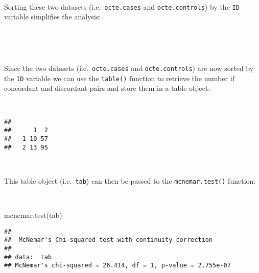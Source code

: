 \documentclass[
  12pt,
  a4paper]{book}
\newenvironment{Shaded}{\begin{snugshade}}{\end{snugshade}}
\newcommand{\FunctionTok}[1]{\textcolor[rgb]{0.00,0.00,0.00}{#1}}
\newcommand{\NormalTok}[1]{#1}
\newcommand{\OtherTok}[1]{\textcolor[rgb]{0.56,0.35,0.01}{#1}}
\newcommand{\SpecialCharTok}[1]{\textcolor[rgb]{0.00,0.00,0.00}{#1}}
\begin{document}
~

Sorting these two datasets (i.e.~\texttt{octe.cases} and \texttt{octe.controls}) by the \texttt{ID} variable simplifies the analysis:

~

\begin{Shaded}
\end{Shaded}

~

Since the two datasets (i.e.~\texttt{octe.cases} and \texttt{octe.controls}) are now sorted by the \texttt{ID} variable we can use the \texttt{table()} function to retrieve the number if concordant and discordant pairs and store them in a table object:

~

\begin{Shaded}
\end{Shaded}

\begin{verbatim}
##    
##      1  2
##   1 10 57
##   2 13 95
\end{verbatim}

~

This table object (i.e.~\texttt{tab}) can then be passed to the \texttt{mcnemar.test()} function:

~

\begin{Shaded}
\begin{Highlighting}[]
\FunctionTok{mcnemar.test}\NormalTok{(tab)}
\end{Highlighting}
\end{Shaded}

\begin{verbatim}
## 
##  McNemar's Chi-squared test with continuity correction
## 
## data:  tab
## McNemar's chi-squared = 26.414, df = 1, p-value = 2.755e-07
\end{verbatim}
\end{document}
